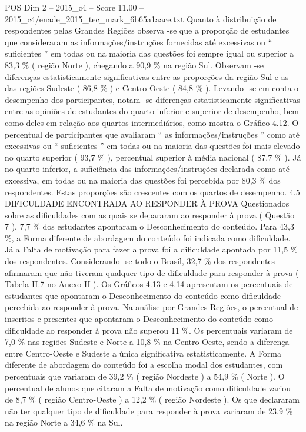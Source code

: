 \begin{textsample}{POS Dim 2 – 2015\_c4 – Score 11.00 – 2015\_c4/enade\_2015\_tec\_mark\_6b65a1aace.txt}
Quanto à distribuição de respondentes pelas Grandes Regiões observa -se que a proporção de estudantes que consideraram as informações/instruções fornecidas até excessivas ou “ suficientes ” em todas ou na maioria das questões foi sempre igual ou superior a 83,3 \% ( região Norte ), chegando a 90,9 \% na região Sul.
Observam -se diferenças estatisticamente significativas entre as proporções da região Sul e as das regiões Sudeste ( 86,8 \% ) e Centro-Oeste ( 84,8 \% ).
Levando -se em conta o desempenho dos participantes, notam -se diferenças estatisticamente significativas entre as opiniões de estudantes do quarto inferior e superior de desempenho, bem como deles em relação aos quartos intermediários, como mostra o Gráfico 4.12.
O percentual de participantes que avaliaram “ as informações/instruções ” como até excessivas ou “ suficientes ” em todas ou na maioria das questões foi mais elevado no quarto superior ( 93,7 \% ), percentual superior à média nacional ( 87,7 \% ).
Já no quarto inferior, a suficiência das informações/instruções declarada como até excessiva, em todas ou na maioria das questões foi percebida por 80,3 \% dos respondentes.
Estas proporções são crescentes com os quartos de desempenho. 4.5 DIFICULDADE ENCONTRADA AO RESPONDER À PROVA Questionados sobre as dificuldades com as quais se depararam ao responder à prova ( Questão 7 ), 7,7 \% dos estudantes apontaram o Desconhecimento do conteúdo.
Para 43,3 \%, a Forma diferente de abordagem do conteúdo foi indicada como dificuldade.
Já a Falta de motivação para fazer a prova foi a dificuldade apontada por 11,5 \% dos respondentes.
Considerando -se todo o Brasil, 32,7 \% dos respondentes afirmaram que não tiveram qualquer tipo de dificuldade para responder à prova ( Tabela II.7 no Anexo II ).
Os Gráficos 4.13 e 4.14 apresentam os percentuais de estudantes que apontaram o Desconhecimento do conteúdo como dificuldade percebida ao responder à prova.
Na análise por Grandes Regiões, o percentual de inscritos e presentes que apontaram o Desconhecimento do conteúdo como dificuldade ao responder à prova não superou 11 \%.
Os percentuais variaram de 7,0 \% nas regiões Sudeste e Norte a 10,8 \% na Centro-Oeste, sendo a diferença entre Centro-Oeste e Sudeste a única significativa estatisticamente.
A Forma diferente de abordagem do conteúdo foi a escolha modal dos estudantes, com percentuais que variaram de 39,2 \% ( região Nordeste ) a 54,9 \% ( Norte ).
O percentual de alunos que citaram a Falta de motivação como dificuldade variou de 8,7 \% ( região Centro-Oeste ) a 12,2 \% ( região Nordeste ).
Os que declararam não ter qualquer tipo de dificuldade para responder à prova variaram de 23,9 \% na região Norte a 34,6 \% na Sul.

\end{textsample}
